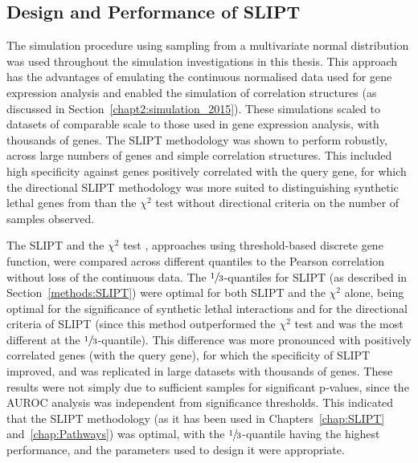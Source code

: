 \subsection{Design and Performance of SLIPT}

The simulation procedure using sampling from a multivariate normal distribution was used throughout the simulation investigations in this thesis. This approach has the advantages of emulating the continuous normalised  data used for \gls{gene expression} analysis and enabled the simulation of correlation structures (as discussed in Section~\ref{chapt2:simulation_2015}). These simulations scaled to datasets of comparable scale to those used in \gls{gene expression} analysis, with thousands of genes. The \gls{SLIPT} methodology was shown to perform robustly, across large numbers of genes and simple correlation structures. This included high specificity against genes positively correlated with the query gene, for which the directional \gls{SLIPT} methodology was more suited to distinguishing \gls{synthetic lethal} genes from than the $\chi^2$ test without directional criteria on the number of samples observed.

The \gls{SLIPT} and the $\chi^2$ test , approaches using threshold-based discrete gene function, were compared across different quantiles to the Pearson correlation without loss of the continuous  data. The $\sfrac{1}{3}$-quantiles for \gls{SLIPT} (as described in Section~\ref{methods:SLIPT}) were optimal for both \gls{SLIPT} and the $\chi^2$ alone, being optimal for the significance of \gls{synthetic lethal} interactions and for the directional criteria of \gls{SLIPT} (since this method outperformed the $\chi^2$ test and was the most different at the $\sfrac{1}{3}$-quantile). This difference was more pronounced with positively correlated genes (with the query gene), for which the specificity of \gls{SLIPT} improved, and was replicated in large datasets with thousands of genes. These results were not simply due to sufficient samples for significant p-values, since the \gls{AUROC} analysis was independent from significance thresholds. This indicated that the \gls{SLIPT} methodology (as it has been used in Chapters~\ref{chap:SLIPT} and~\ref{chap:Pathways}) was optimal, with the $\sfrac{1}{3}$-quantile having the highest performance, and the parameters used to design it were appropriate.

